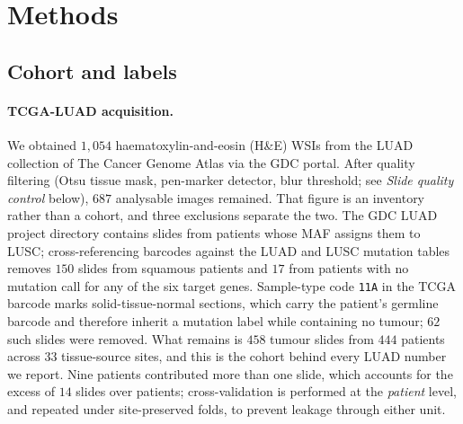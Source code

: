 \section*{Methods}

\subsection*{Cohort and labels}

\paragraph{TCGA-LUAD acquisition.}
We obtained $1{,}054$ haematoxylin-and-eosin (H\&E) WSIs
from the LUAD collection of The Cancer Genome Atlas via the
GDC portal.\cite{tcga2014luad}
After quality filtering (Otsu tissue mask, pen-marker detector,
blur threshold; see \emph{Slide quality control} below), $687$
analysable images remained. That figure is an inventory rather than a
cohort, and three exclusions separate the two. The GDC LUAD project
directory contains slides from patients whose MAF assigns them to
LUSC; cross-referencing barcodes against the LUAD and LUSC mutation
tables removes $150$ slides from squamous patients and $17$ from
patients with no mutation call for any of the six target genes.
Sample-type code \texttt{11A} in the TCGA barcode marks
solid-tissue-normal sections, which carry the patient's germline
barcode and therefore inherit a mutation label while containing no
tumour; $62$ such slides were removed. What remains is $458$ tumour
slides from $444$ patients across $33$ tissue-source sites, and this
is the cohort behind every LUAD number we report. Nine patients
contributed more than one slide, which accounts for the excess of $14$
slides over patients; cross-validation is performed at the
\emph{patient} level, and repeated under site-preserved folds, to
prevent leakage through either unit.


